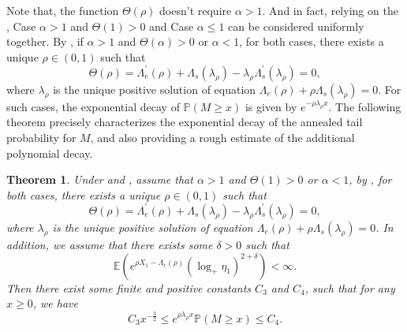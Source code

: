 \documentclass[]{article}
\numberwithin{equation}{section}
\theoremstyle{thmstyleone}%
\newtheorem{theorem}{Theorem}%
\theoremstyle{thmstyletwo}%
\theoremstyle{thmstylethree}%
\theoremstyle{thmstylefour}%
\theoremstyle{thmstylefive}%
\theoremstyle{thmstylesix}%
\newcommand{\E}{\mathbb{E}}
\renewcommand{\P}{\mathbb{P}}
\begin{document}
	Note that, the function $\varTheta(\rho)$ doesn't require $\alpha>1$. And in fact, relying on the , Case $\alpha>1$ and $\varTheta(1)>0$ and Case $\alpha\leqslant 1$ can be considered uniformly together.
	By , if $\alpha>1$ and $\varTheta(\alpha)>0$ or $\alpha<1$, for both cases, there exists a unique $\rho\in(0,1)$ such that
	\begin{equation}
		\varTheta(\rho)= \Lambda_e^\prime(\rho) + \Lambda_s(\lambda_\rho) -\lambda_\rho \Lambda_s^\prime(\lambda_\rho) = 0,
	\end{equation}
	where $\lambda_\rho$ is the unique positive solution of equation $\Lambda_e(\rho)+\rho\Lambda_s(\lambda_\rho) =0$.
	For such cases, the exponential decay of $\P(M\geqslant x)$ is given by $ e^{-\rho\lambda_\rho x} $. The following theorem precisely characterizes the exponential decay of the annealed tail probability for $M$, and also providing a rough estimate of the additional polynomial decay.
	
	\begin{theorem}\label{Theorem of weakly cases}
		Under  and , assume that $\alpha>1$ and $\varTheta(1)>0$ or $\alpha<1$, by , for both cases, there exists a unique $\rho\in(0,1)$ such that
		\begin{equation}\label{25}
			\varTheta(\rho)= \Lambda_e^\prime(\rho) + \Lambda_s(\lambda_\rho) -\lambda_\rho \Lambda_s^\prime(\lambda_\rho) = 0,
		\end{equation}
		where $\lambda_\rho$ is the unique positive solution of equation $\Lambda_e(\rho)+\rho\Lambda_s(\lambda_\rho) =0$.
		In addition, we assume that there exists some $\delta>0$ such that
		\begin{equation}\label{additional assumption for weakly}
			\E\left(e^{\rho X_1-\Lambda_e(\rho)} (\log_+ \eta_1)^{2+\delta}\right)<\infty.
		\end{equation}
		Then there exist some finite and positive constants $C_3$ and $C_4$, such that for any $x\geqslant 0$, we have
		\begin{equation}
			C_3 x^{-\frac{3}{2}} \leqslant e^{\rho\lambda_\rho x }\P(M\geqslant x ) \leqslant C_4.
		\end{equation}
	\end{theorem}
	
\end{document}
